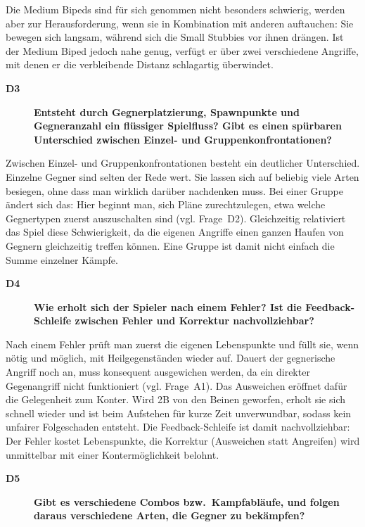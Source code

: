 \documentclass[../Main.tex]{subfiles}
\begin{document}
Die Medium Bipeds sind für sich genommen nicht besonders schwierig, werden aber zur Herausforderung, wenn sie in Kombination mit anderen auftauchen: Sie bewegen sich langsam, während sich die Small Stubbies vor ihnen drängen. Ist der Medium Biped jedoch nahe genug, verfügt er über zwei verschiedene Angriffe, mit denen er die verbleibende Distanz schlagartig überwindet.

\begin{description}
    \item[\textbf{D3}] \textbf{Entsteht durch Gegnerplatzierung, Spawnpunkte und Gegneranzahl ein flüssiger Spielfluss? Gibt es einen spürbaren Unterschied zwischen Einzel- und Gruppenkonfrontationen?}
\end{description}

Zwischen Einzel- und Gruppenkonfrontationen besteht ein deutlicher Unterschied. Einzelne Gegner sind selten der Rede wert. Sie lassen sich auf beliebig viele Arten besiegen, ohne dass man wirklich darüber nachdenken muss. Bei einer Gruppe ändert sich das: Hier beginnt man, sich Pläne zurechtzulegen, etwa welche Gegnertypen zuerst auszuschalten sind (vgl. Frage~D2). Gleichzeitig relativiert das Spiel diese Schwierigkeit, da die eigenen Angriffe einen ganzen Haufen von Gegnern gleichzeitig treffen können. Eine Gruppe ist damit nicht einfach die Summe einzelner Kämpfe.

\begin{description}
    \item[\textbf{D4}] \textbf{Wie erholt sich der Spieler nach einem Fehler? Ist die Feedback-Schleife zwischen Fehler und Korrektur nachvollziehbar?}
\end{description}

Nach einem Fehler prüft man zuerst die eigenen Lebenspunkte und füllt sie, wenn nötig und möglich, mit Heilgegenständen wieder auf. Dauert der gegnerische Angriff noch an, muss konsequent ausgewichen werden, da ein direkter Gegenangriff nicht funktioniert (vgl. Frage~A1). Das Ausweichen eröffnet dafür die Gelegenheit zum Konter. Wird 2B von den Beinen geworfen, erholt sie sich schnell wieder und ist beim Aufstehen für kurze Zeit unverwundbar, sodass kein unfairer Folgeschaden entsteht. Die Feedback-Schleife ist damit nachvollziehbar: Der Fehler kostet Lebenspunkte, die Korrektur (Ausweichen statt Angreifen) wird unmittelbar mit einer Kontermöglichkeit belohnt.

\begin{description}
    \item[\textbf{D5}] \textbf{Gibt es verschiedene Combos bzw.\ Kampfabläufe, und folgen daraus verschiedene Arten, die Gegner zu bekämpfen?}
\end{description}
\end{document}
